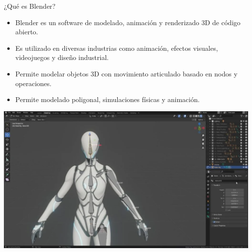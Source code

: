 \begin{frame}{¿Qué es Blender?}
    \begin{itemize}
        \item Blender es un software de modelado, animación y renderizado 3D de código abierto.
        \item Es utilizado en diversas industrias como animación, efectos visuales, videojuegos y diseño industrial.
        \item Permite modelar objetos 3D con movimiento articulado basado en nodos y operaciones.
        \item Permite modelado poligonal, simulaciones físicas y animación.
    \end{itemize}
    \begin{center}
        \includegraphics[width=0.4\linewidth]{01_Blender/blender.png}
    \end{center}
\end{frame}


